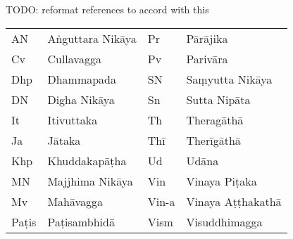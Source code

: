 \clearpage
{}
\bigskip

TODO: reformat references to accord with this

\bigskip

\begin{tabular}{@{}ll ll@{}}
  AN & Aṅguttara Nikāya & Pr & Pārājika\\
  Cv & Cullavagga &       Pv & Parivāra\\
  Dhp & Dhammapada &      SN & Saṃyutta Nikāya \\
  DN & Digha Nikāya  &    Sn & Sutta Nipāta\\
  It & Itivuttaka &       Th & Theragāthā \\
  Ja & Jātaka &           Thī & Therīgāthā\\
  Khp & Khuddakapāṭha &   Ud & Udāna\\
  MN & Majjhima Nikāya &  Vin & Vinaya Piṭaka\\
  Mv & Mahāvagga &        Vin-a & Vinaya Aṭṭhakathā\\
  Paṭis & Paṭisambhidā &  Vism & Visuddhimagga\\
\end{tabular}

%
%

